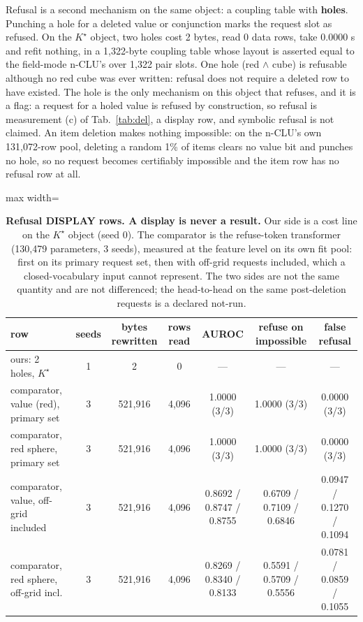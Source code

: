 \documentclass{article} %
\newcommand{\Kstar}{\ensuremath{K^{\star}}}
\begin{document}
Refusal is a second mechanism on the same object: a coupling table with \textbf{holes}.
Punching a hole for a deleted value or conjunction marks the request slot as refused. On the
$\Kstar$ object, two holes cost 2 bytes, read 0 data rows, take 0.0000 s and refit nothing, in
a 1,322-byte coupling table whose layout is asserted equal to the field-mode n-CLU's over 1,322 pair
slots. %
One hole (red $\wedge$ cube) is refusable although no red cube was ever written: refusal does
not require a deleted row to have existed. %
The hole is the only mechanism on this object that refuses, and it is a flag: a request for a
holed value is refused by construction, so refusal is measurement (c) of Tab.~\ref{tab:del}, a
display row, and symbolic refusal is not claimed. An item deletion makes nothing impossible: on the n-CLU's own 131,072-row pool, deleting a random
1\% of items clears no value bit and punches no hole, so no request becomes certifiably impossible
and the item row has no refusal row at all. %

\begin{table}[t]
\centering\small
\caption{\textbf{Refusal DISPLAY rows. A display is never a result.} Our side is a cost line
on the $\Kstar$ object (seed 0). The comparator is the refuse-token transformer (130,479
parameters, 3 seeds), measured at the feature level on its own fit pool: first on its primary
request set, then with off-grid requests included, which a closed-vocabulary input cannot
represent. The two sides are not the same quantity and are not differenced; the head-to-head on
the same post-deletion requests is a declared not-run.}
\label{tab:hole}
\setlength{\tabcolsep}{3pt}
\begin{adjustbox}{max width=\linewidth}\begin{tabular}{lcccccc}
\toprule
row & seeds & bytes rewritten & rows read & AUROC & refuse on impossible & false refusal \\
\midrule
ours: 2 holes, $\Kstar$ & 1 & 2 & 0 & --- & --- & --- \\ %
comparator, value (red), primary set & 3 & 521,916 & 4,096 & 1.0000 (3/3) & 1.0000 (3/3) & 0.0000 (3/3) \\
comparator, red sphere, primary set & 3 & 521,916 & 4,096 & 1.0000 (3/3) & 1.0000 (3/3) & 0.0000 (3/3) \\
comparator, value, off-grid included & 3 & 521,916 & 4,096 & 0.8692 / 0.8747 / 0.8755 & 0.6709 / 0.7109 / 0.6846 & 0.0947 / 0.1270 / 0.1094 \\
comparator, red sphere, off-grid incl. & 3 & 521,916 & 4,096 & 0.8269 / 0.8340 / 0.8133 & 0.5591 / 0.5709 / 0.5556 & 0.0781 / 0.0859 / 0.1055 \\
\bottomrule
\end{tabular}\end{adjustbox}
\end{table}
\end{document}
